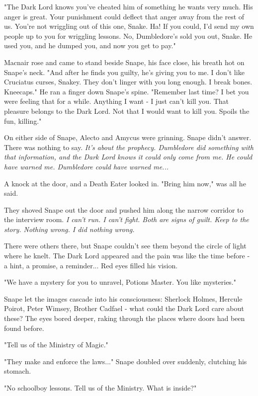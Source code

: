 \documentclass[a4paper,11pt]{article}
\begin{document}
"The Dark Lord knows you've cheated him of something he wants very much. His anger is great. Your punishment could deflect that anger away from the rest of us. You're not wriggling out of this one, Snake. Ha! If you could, I'd send my own people up to you for wriggling lessons. No, Dumbledore's sold you out, Snake. He used you, and he dumped you, and now you get to pay."

Macnair rose and came to stand beside Snape, his face close, his breath hot on Snape's neck. "And after he finds you guilty, he's giving you to me. I don't like Cruciatus curses, Snakey. They don't linger with you long enough. I break bones. Kneecaps." He ran a finger down Snape's spine. "Remember last time? I bet you were feeling that for a while. Anything I want - I just can't kill you. That pleasure belongs to the Dark Lord. Not that I would want to kill you. Spoils the fun, killing."

On either side of Snape, Alecto and Amycus were grinning. Snape didn't answer. There was nothing to say. \emph{It's about the prophecy. Dumbledore did something with that information, and the Dark Lord knows it could only come from me. He could have warned me. Dumbledore could have warned me...}

A knock at the door, and a Death Eater looked in. "Bring him now," was all he said.

They shoved Snape out the door and pushed him along the narrow corridor to the interview room. \emph{I can't run. I can't fight. Both are signs of guilt. Keep to the story. Nothing wrong. I did nothing wrong.}

There were others there, but Snape couldn't see them beyond the circle of light where he knelt. The Dark Lord appeared and the pain was like the time before - a hint, a promise, a reminder... Red eyes filled his vision.

"We have a mystery for you to unravel, Potions Master. You like mysteries."

Snape let the images cascade into his consciousness: Sherlock Holmes, Hercule Poirot, Peter Wimsey, Brother Cadfael - what could the Dark Lord care about these? The eyes bored deeper, raking through the places where doors had been found before.

"Tell us of the Ministry of Magic."

"They make and enforce the laws..." Snape doubled over suddenly, clutching his stomach.

"No schoolboy lessons. Tell us of the Ministry. What is inside?"
\end{document}
